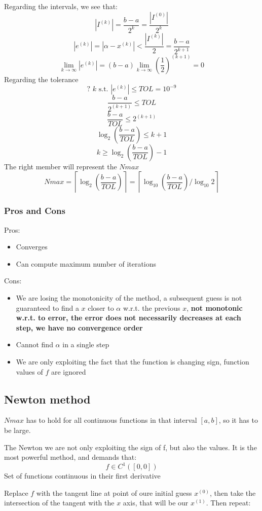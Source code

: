 Regarding the intervals, we see that:
$$
|I^{(k)}|=\frac{b-a}{2^k}=\frac{|I^{(0)}|}{2^k}
$$
$$
|e^{(k)}|=|\alpha-x^{(k)}|<\frac{|I^{(k)}|}{2}=\frac{b-a}{2^{k+1}}
$$
$$
\lim_{k\rightarrow\infty}|e^{(k)}|=(b-a)\lim_{k\rightarrow\infty}\left(\frac{1}{2}\right)^{(k+1)}=0
$$
Regarding the tolerance
$$
?\,\,k\text{ s.t. }|e^{(k)}|\leq TOL=10^{-9}
$$
$$
\frac{b-a}{2^{(k+1)}}\leq TOL
$$
$$
\frac{b-a}{TOL}\leq 2^{(k+1)}
$$
$$
\log_2\left(
    \frac{b-a}{TOL}
\right)\leq k+1
$$
$$
k\geq\log_2\left(
    \frac{b-a}{TOL}
\right)-1
$$
The right member will represent the $Nmax$
$$
Nmax=\left\lceil\log_2\left(
    \frac{b-a}{TOL}
\right)\right\rceil=
\left\lceil\log_{10}\left(
    \frac{b-a}{TOL}
\right)/\log_{10}2\right\rceil
$$

\subsubsection{Pros and Cons}
Pros:
\begin{itemize}
    \item Converges
    \item Can compute maximum number of iterations
\end{itemize}
Cons:
\begin{itemize}
    \item We are losing the monotonicity of the method, a subsequent guess is not guaranteed to find a $x$ closer to $\alpha$ w.r.t. the previous $x$, \textbf{not monotonic w.r.t. to error, the error does not necessarily decreases at each step, we have no convergence order}
    \item Cannot find $\alpha$ in a single step
    \item We are only exploiting the fact that the function is changing sign, function values of $f$ are ignored
\end{itemize}

\subsection{Newton method}
$Nmax$ has to hold for all continuous functions in that interval $[a,b]$, so it has to be large.

The Newton we are not only exploiting the sign of f, but also the values. It is the most powerful method, and demands that:
$$f\in C^1([0,0])$$
Set of functions continuous in their first derivative

Replace $f$ with the tangent line at point of oure initial guess $x^{(0)}$, then take the intersection of the tangent with the $x$ axis, that will be our $x^{(1)}$. Then repeat:

